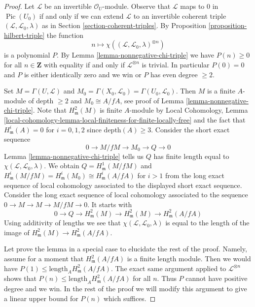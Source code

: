 \documentclass{stacks-project}
\theoremstyle{plain}
\theoremstyle{definition}
\theoremstyle{remark}
\numberwithin{equation}{subsection}
\def\Pic{\mathop{\mathrm{Pic}}\nolimits}
\begin{document}
\begin{proof}
Let $\mathcal{L}$ be an invertible $\mathcal{O}_U$-module.
Observe that $\mathcal{L}$ maps to $0$ in $\Pic(U_0)$
if and only if we can extend $\mathcal{L}$ to an invertible
coherent triple $(\mathcal{L}, \mathcal{L}_0, \lambda)$
as in Section \ref{section-coherent-triples}.
By Proposition \ref{proposition-hilbert-triple}
the function
$$
n \longmapsto \chi((\mathcal{L}, \mathcal{L}_0, \lambda)^{\otimes n})
$$
is a polynomial $P$. By Lemma \ref{lemma-nonnegative-chi-triple}
we have
$P(n) \geq 0$ for all $n \in \mathbf{Z}$ with equality if and only if
$\mathcal{L}^{\otimes n}$ is trivial. In particular $P(0) = 0$
and $P$ is either identically zero and we win or $P$ has even degree $\geq 2$.

\medskip\noindent
Set $M = \Gamma(U, \mathcal{L})$ and
$M_0 = \Gamma(X_0, \mathcal{L}_0) = \Gamma(U_0, \mathcal{L}_0)$.
Then $M$ is a finite $A$-module of depth $\geq 2$
and $M_0 \cong A/fA$, see proof of Lemma \ref{lemma-nonnegative-chi-triple}.
Note that $H^2_\mathfrak m(M)$ is finite $A$-module by
Local Cohomology, Lemma
\ref{local-cohomology-lemma-local-finiteness-for-finite-locally-free}
and the fact that $H^i_\mathfrak m(A) = 0$ for $i = 0, 1, 2$
since $\text{depth}(A) \geq 3$.
Consider the short exact sequence
$$
0 \to M/fM \to M_0 \to Q \to 0
$$
Lemma \ref{lemma-nonnegative-chi-triple} tells us $Q$ has finite length
equal to $\chi(\mathcal{L}, \mathcal{L}_0, \lambda)$.
We obtain $Q = H^1_\mathfrak m(M/fM)$ and
$H^i_\mathfrak m(M/fM) = H^i_\mathfrak m(M_0) \cong H^i_\mathfrak m(A/fA)$
for $i > 1$ from the long exact sequence of local cohomology
associated to the displayed short exact sequence. Consider the long
exact sequence of local cohomology associated to the sequence
$0 \to M \to M \to M/fM \to 0$. It starts with
$$
0 \to Q \to H^2_\mathfrak m(M) \to H^2_\mathfrak m(M) \to
H^2_\mathfrak m(A/fA)
$$
Using additivity of lengths we see that
$\chi(\mathcal{L}, \mathcal{L}_0, \lambda)$
is equal to the length of the image of
$H^2_\mathfrak m(M) \to H^2_\mathfrak m(A/fA)$.

\medskip\noindent
Let prove the lemma in a special case to elucidate the rest of the proof.
Namely, assume for a moment that $H^2_\mathfrak m(A/fA)$ is
a finite length module. Then
we would have $P(1) \leq \text{length}_A H^2_\mathfrak m(A/fA)$.
The exact same argument applied to $\mathcal{L}^{\otimes n}$ shows that
$P(n) \leq \text{length}_A H^2_\mathfrak m(A/fA)$ for all $n$.
Thus $P$ cannot have positive degree and we win.
In the rest of the proof we will modify this argument to give
a linear upper bound for $P(n)$ which suffices.


\end{proof}
\end{document}
